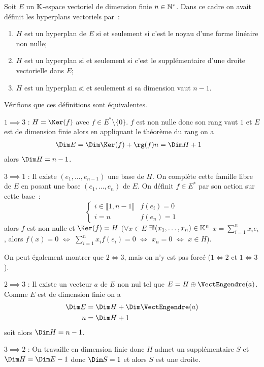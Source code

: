 Soit $E$ un $\mathbb{K}$-espace vectoriel de dimension finie $n \in \mathbb{N}^*$. Dans ce cadre on avait définit les hyperplans vectoriels par~:
\begin{enumerate}
\item $H$ est un hyperplan de $E$ si et seulement si c'est le noyau d'une forme linéaire non nulle;
\item $H$ est un hyperplan si et seulement si c'est le supplémentaire d'une droite vectorielle dans $E$;
\item $H$ est un hyperplan si et seulement si sa dimension vaut $n-1$.
\end{enumerate}

Vérifions que ces définitions sont équivalentes.

$1 \implies 3$ : $H=\Ker(f)$ avec $f \in E^* \setminus\{0\}$. $f$ est non nulle donc son rang vaut $1$ et $E$ est de dimension finie alors en appliquant le théorème du rang on a
\begin{align}
  \Dim E &= \Dim \Ker(f) +\rg(f)
  n= \Dim H +1
\end{align}
alors $\Dim H = n-1$.

$3 \implies 1$ : Il existe $(e_1, \ldots, e_{n-1})$ une base de $H$. On complète cette famille libre de $E$ en posant une base $(e_1, \ldots, e_{n})$ de $E$. On définit $f\in E^*$ par son action sur cette base~:
\begin{equation}
  \begin{cases}
    i \in \llbracket 1, n-1 \rrbracket & f(e_i)=0 \\
    i=n & f(e_n)=1
  \end{cases}
\end{equation}
alors $f$ est non nulle et $\Ker(f)=H$ ($\forall x \in E$ $\exists! (x_1, \ldots, x_n) \in \mathbb{K}^n$ $x = \sum_{i=1}^n x_i e_i$, alors $f(x)=0$ $\iff$ $\sum_{i=1}^n x_i f(e_i)=0$ $\iff$ $x_n=0$ $\iff$ $x \in H$).

On peut également montrer que $2 \iff 3$, mais on n'y est pas forcé ($1 \iff 2$ et $1 \iff 3$).

$2 \implies 3$ : Il existe un vecteur $a$ de $E$ non nul tel que $E=H \oplus \VectEngendre(a)$. Comme $E$ est de dimension finie on a
\begin{align}
  \Dim E &= \Dim H +\Dim \VectEngendre(a)\\
  n &= \Dim H +1
\end{align}
soit alors $\Dim H = n-1$.

$3 \implies 2$ : On travaille en dimension finie donc $H$ admet un supplémentaire $S$ et $\Dim H = \Dim E -1$ donc $\Dim S=1$ et alors $S$ est une droite.

